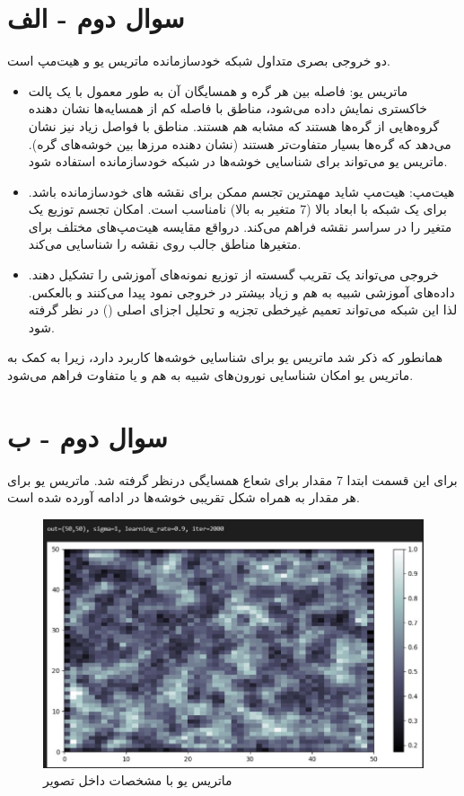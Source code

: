 \documentclass{article}
\begin{document}
\section{سوال دوم - الف}

دو خروجی بصری متداول شبکه خودسازمانده ماتریس یو و هیت‌مپ است.

\begin{itemize}
    \item ماتریس یو: فاصله بین هر گره و همسایگان آن به طور معمول با یک پالت خاکستری نمایش داده می‌شود، مناطق با فاصله کم از همسایه‌ها نشان دهنده گروه‌هایی از گره‌ها هستند که مشابه هم هستند. مناطق با فواصل زیاد نیز نشان می‌دهد که گره‌ها بسیار متفاوت‌تر هستند (نشان دهنده مرزها بین خوشه‌های گره). ماتریس یو می‌تواند برای شناسایی خوشه‌ها در شبکه خودسازمانده استفاده شود.
    \item هیت‌مپ: هیت‌مپ شاید مهمترین تجسم ممکن برای نقشه های خودسازمانده باشد. برای یک شبکه با ابعاد بالا (7 متغیر به بالا) نامناسب است. امکان تجسم توزیع یک متغیر را در سراسر نقشه فراهم می‌کند. درواقع مقایسه هیت‌مپ‌های مختلف برای متغیرها مناطق جالب روی نقشه را شناسایی می‌کند. 
    \item خروجی می‌تواند یک تقریب گسسته از توزیع نمونه‌های آموزشی را تشکیل دهند. داده‌های آموزشی شبیه به هم و زیاد بیشتر در خروجی نمود پیدا می‌کنند و بالعکس. لذا این شبکه می‌تواند تعمیم غیرخطی تجزیه و تحلیل اجزای اصلی () در نظر گرفته شود. 
\end{itemize}

همانطور که ذکر شد ماتریس یو برای شناسایی خوشه‌ها کاربرد دارد، زیرا به کمک به ماتریس یو امکان شناسایی نورون‌های شبیه به هم و یا متفاوت فراهم می‌شود.

\newpage
\section{سوال دوم - ب}

برای این قسمت ابتدا 7 مقدار برای شعاع همسایگی درنظر گرفته شد. ماتریس یو برای هر مقدار به همراه شکل تقریبی خوشه‌ها در ادامه آورده شده است. 

\begin{figure}[!h]
    \centering\includegraphics[scale=.65]{./p3-1}
    \caption{ماتریس یو با مشخصات داخل تصویر}\label{fig.31}
\end{figure}
\end{document}
